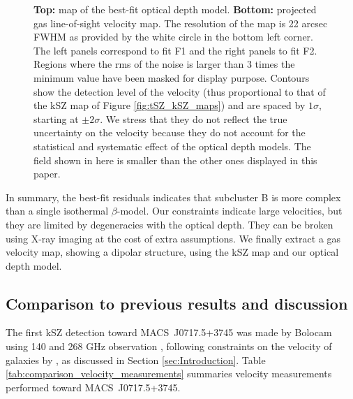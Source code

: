 \documentclass[twocolumn,traditabstract]{aa}
\begin{document}
\begin{figure}[h]
\caption{\footnotesize{{\bf Top:} map of the best-fit optical depth model. {\bf Bottom:} projected gas line-of-sight velocity map. The resolution of the map is 22 arcsec FWHM as provided by the white circle in the bottom left corner. The left panels correspond to fit F1 and the right panels to fit F2. Regions where the rms of the noise is larger than 3 times the minimum value have been masked for display purpose. Contours show the detection level of the velocity (thus proportional to that of the kSZ map of Figure \ref{fig:tSZ_kSZ_maps}) and are spaced by $1 \sigma$, starting at $\pm 2 \sigma$. We stress that they do not reflect the true uncertainty on the velocity because they do not account for the statistical and systematic effect of the optical depth models. The field shown in here is smaller than the other ones displayed in this paper.}}
\label{fig:velocity_tau_map}
\end{figure}

In summary, the best-fit residuals indicates that subcluster B is more complex than a single isothermal $\beta$-model. Our constraints indicate large velocities, but they are limited by degeneracies with the optical depth. They can be broken using X-ray imaging at the cost of extra assumptions. We finally extract a gas velocity map, showing a dipolar structure, using the kSZ map and our optical depth model.

\subsection{Comparison to previous results and discussion}
The first kSZ detection toward \mbox{MACS~J0717.5+3745} was made by Bolocam using 140 and 268 GHz observation \citep{Sayers2013}, following constraints on the velocity of galaxies by \cite{Ma2009}, as discussed in Section \ref{sec:Introduction}. Table \ref{tab:comparison_velocity_measurements} summaries velocity measurements performed toward \mbox{MACS~J0717.5+3745}.
\end{document}
